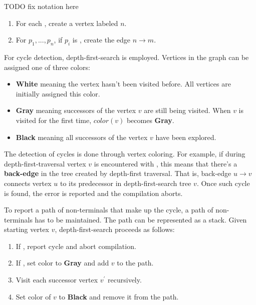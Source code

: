 TODO fix notation here

\begin{enumerate}
\item
For each \NtDefinitionN[n], create a vertex  labeled $n$.
\item
For $p_1, ..., p_n$, if $p_i$ is \NtDefinitionN[m], create the edge $n\rightarrow m$.
\end{enumerate}


For cycle detection, depth-first-search is employed. Vertices in the graph can be assigned one of three colors:

\begin{itemize}
\item

\textbf{White} meaning the vertex hasn't been visited before. All vertices are initially assigned this color.

\item
\textbf{Gray} meaning successors of the vertex $v$ are still being visited. When $v$ is visited for the first time, $color(v)$ becomes \textbf{Gray}.
\item
\textbf{Black} meaning all successors of the vertex $v$ have been explored. 
\end{itemize}



The detection of cycles is done through vertex coloring. For example, if during depth-first-traversal vertex $v$ is encountered with , this means that there's a \textbf{back-edge} in the tree created by depth-first traversal. That is, back-edge $u \rightarrow v$ connects vertex $u$ to its predecessor in depth-first-search tree $v$. Once such cycle is found, the error is reported and the compilation aborts.

To report a path of non-terminals that make up the cycle, a path of non-terminals has to be maintained. The path can be represented as a stack. Given starting vertex $v$, depth-first-search proceeds as follows:

\begin{enumerate}
\item If , report cycle and abort compilation.
\item If , set color to \textbf{Gray} and add $v$ to the path. 
\item Visit each successor vertex $v^{\prime}$ recursively.
\item Set color of $v$ to \textbf{Black} and remove it from the path.
\end{enumerate}

